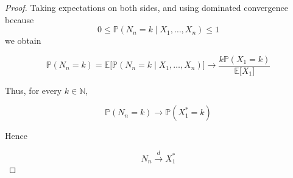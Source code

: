 \begin{proof}
Taking expectations on both sides, and using dominated convergence because
\[0 \leq \mathbb{P}(\mathit{N}_{\mathit{n}} = \mathit{k} \mid \mathit{X}_{1},\ldots,\mathit{X}_{\mathit{n}}) \leq 1\]
we obtain

\[\mathbb{P}(\mathit{N}_{\mathit{n}} = \mathit{k}) = \mathbb{E}\lbrack\mathbb{P}(\mathit{N}_{\mathit{n}} = \mathit{k} \mid \mathit{X}_{1},\ldots,\mathit{X}_{\mathit{n}})\rbrack\rightarrow\frac{\mathit{k}\mathbb{P}(\mathit{X}_{1} = \mathit{k})}{\mathbb{E}\lbrack\mathit{X}_{1}\rbrack}\]

Thus, for every \(\mathit{k} \in \mathbb{N}\),

\[\mathbb{P}(\mathit{N}_{\mathit{n}} = \mathit{k})\rightarrow\mathbb{P}(\mathit{X}_{1}^{\ast} = \mathit{k})\]

Hence

\[\mathit{N}_{\mathit{n}}\overset{\mathit{d}}{\rightarrow}\mathit{X}_{1}^{\ast}\]

\end{proof}
